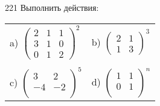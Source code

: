 \newpage
\begin{problem}{221}
Выполнить действия: \\
\noindent
\begin{tabular}{ll}
a) 
$\left(
\begin{array}{rrr}
2 & 1 & 1\\
3 & 1 & 0\\
0 & 1 & 2
\end{array}
\right)^2
$ 
& b)
$\left(
\begin{array}{rr}
2 & 1 \\
1 & 3
\end{array}
\right)^3
$ \\
 & \\
c)
$\left(
\begin{array}{rr}
3 & 2 \\
-4 & -2 \\
\end{array}
\right)^5
$
& d)
$\left(
\begin{array}{rr}
1 & 1 \\
0 & 1 \\
\end{array}
\right)^n
$
\\
\end{tabular}

\end{problem}
